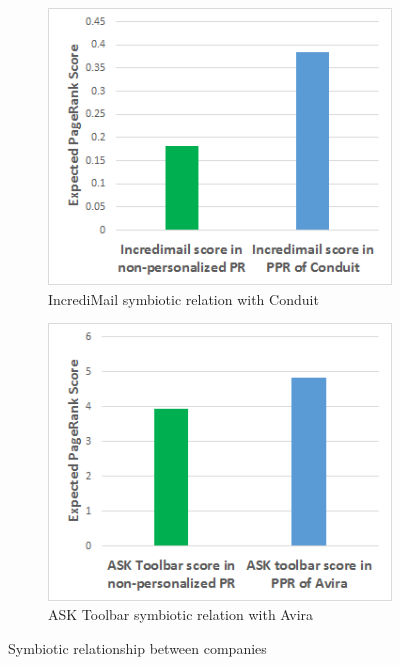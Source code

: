 \documentclass[ijoc,nonblindrev]{informs3} %
\numberwithin{equation}{subsection}
\begin{document}
\begin{figure}[!htbp]
\centering
\begin{subfigure}[b]{0.4\textwidth}
	\centering
\includegraphics[width=\textwidth]{figures/incredi_sym_conduit1.png}
\caption{IncrediMail symbiotic relation with Conduit}
\label{fig:incredi_sym_conduit}
\end{subfigure}
\begin{subfigure}[b]{0.4\textwidth}
	\centering
\includegraphics[width=\textwidth]{figures/ask_sym_avira.png}
\caption{ASK Toolbar symbiotic relation with Avira}
\label{fig:ask_sym_avira}
\end{subfigure}
\caption{Symbiotic relationship between companies}
	\label{fig:symbiotic_pagerank}
\end{figure}
\end{document}
